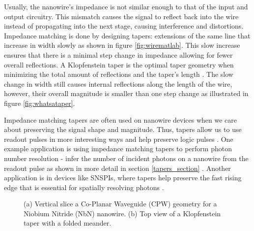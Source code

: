 \documentclass[]{article}
\newcommand{\todoref}[2][]{}
\newcommand{\todofig}[2][]{}
\newcommand{\todoidea}[2][]{}
\begin{document}
Usually, the nanowire's impedance is not similar enough to that of the input and output circuitry. This mismatch causes the signal to reflect back into the wire instead 
of propagating into the next stage, causing interference and distortions. Impedance 
matching is done by designing tapers: extensions of the same line that increase in 
width slowly as shown in figure \ref{fig:wirematlab}. This slow increase ensures 
that there is a minimal step change in impedance allowing for fewer overall reflections. A Klopfenstein taper is the optimal taper geometry when minimizing the total amount 
of reflections and the taper's length \cite{klopfenstein_transmission_1956}. 
The slow change in width still causes internal reflections along the length of the 
wire, however, their overall magnitude is smaller than one step change as illustrated in 
figure \ref{fig:whatsataper}.
\todoidea[inline]{mayhaps exponential taper, etc.}

Impedance matching tapers are often used on nanowire devices when we care about preserving
the signal shape and magnitude. Thus, tapers allow us to use readout 
pulses in more
interesting ways and help preserve logic pulses \cite{snspi_paper, snspd-tapers-paper, maximizing_ic_w_taper}. 
One example application is using impedance matching tapers to
perform photon number resolution - infer the number of incident photons on a nanowire
from the readout pulse as shown in more detail in section \ref{tapers_section} \cite{pnr} \todoref[]{taper PNR}.
Another application is in devices like SNSPIs, where tapers help preserve the fast rising edge that is essential for spatially
resolving photons \cite{snspi_paper}. 

\begin{figure}[h]
    \centering
    \caption{(a) Vertical slice a Co-Planar Waveguide (CPW) geometry for a Niobium Nitride (NbN) nanowire. (b) Top view of a Klopfenstein taper with a folded meander.\todofig[inline]{Forgot a layer lol}}
    \label{fig:thewiredesign}
\end{figure}
\end{document}
